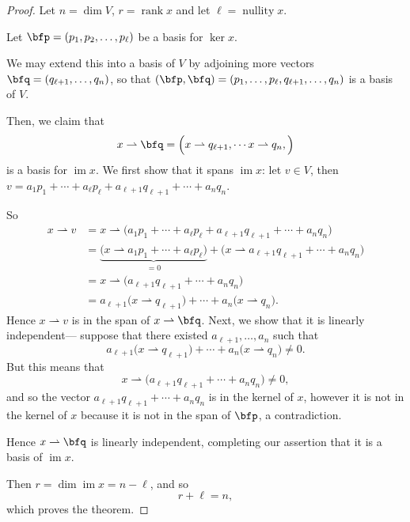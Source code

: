 \documentclass{article}
\DeclareMathOperator{\im}{im}
\DeclareMathOperator{\rank}{rank}
\DeclareMathOperator{\nullity}{nullity}
\begin{document}
\begin{proof}
    Let $n = \dim V$, $r = \rank x$ and let $\ell = \nullity x$.

    Let $\bfp=(p_1,p_2,\ldots,p_\ell)$ be a basis for $\ker x$.

    We may extend this into a basis of $V$ by adjoining more vectors $\bfq=(q_{\ell+1},\ldots,q_n)$, so that $(\bfp,\bfq) = (p_1,\ldots,p_\ell,q_{\ell+1},\ldots,q_n)$ is a basis of $V$.

    Then, we claim that
    \[
        x \rightharpoonup \bfq
        =
        \Big(
            x \rightharpoonup q_{\ell+1},
            \cdots
            x \rightharpoonup q_n,
        \Big)
    \]
    is a basis for $\im x$.
    We first show that it spans $\im x$: let $v \in V$, then $v = a_1p_1 + \cdots + a_\ell p_\ell + a_{\ell+1} q_{\ell+1} + \cdots + a_nq_n$.

    So
    \begin{align*}
        x \rightharpoonup v
        &=
        x \rightharpoonup 
        \Big(
            a_1p_1 + \cdots + a_\ell p_\ell + a_{\ell+1} q_{\ell+1} + \cdots + a_n q_n
        \Big)
        \\
        &=
        \underbrace{
            \Big(
                x \rightharpoonup a_1p_1 + \cdots + a_\ell p_\ell
            \Big)
        }_{=0}
        + 
        \Big(
            x \rightharpoonup a_{\ell+1} q_{\ell+1} + \cdots + a_n q_n
        \Big)
        \\
        &=
        x \rightharpoonup 
        \Big(
            a_{\ell+1} q_{\ell+1} + \cdots + a_n q_n
        \Big)
        \\
        &=
        a_{\ell+1}\Big(
            x \rightharpoonup q_{\ell+1}
        \Big)
        + \cdots
        + a_n\Big(
            x \rightharpoonup q_n
        \Big).
    \end{align*}
    Hence $x \rightharpoonup v$ is in the span of $x \rightharpoonup \bfq$.
    Next, we show that it is linearly independent--- suppose that there existed $a_{\ell+1}, \ldots, a_n$ such that
    \[
        a_{\ell+1}\Big(
            x \rightharpoonup q_{\ell+1}
        \Big)
        + \cdots
        + a_n\Big(
            x \rightharpoonup q_n
        \Big)
        \neq
        0.
    \]
    But this means that
    \[
        x \rightharpoonup 
        \Big(
            a_{\ell+1} q_{\ell+1} + \cdots + a_n q_n
        \Big)
        \neq
        0,
    \]
    and so the vector $a_{\ell+1} q_{\ell+1} + \cdots + a_n q_n$ is in the kernel of $x$, however it is not in the kernel of $x$ because it is not in the span of $\bfp$, a contradiction.

    Hence $x \rightharpoonup \bfq$ is linearly independent, completing our assertion that it is a basis of $\im x$.

    Then $r = \dim \im x = n - \ell$, and so
    \[
        r + \ell 
        = 
        n,
    \]
    which proves the theorem.
\end{proof}
\end{document}
